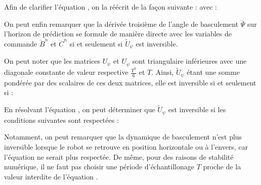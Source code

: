 					Afin de clarifier l'équation , on la réécrit de la façon suivante :
					avec :
				
					
					On peut enfin remarquer que la dérivée troisième de l'angle de basculement $\dddot\Psi$ sur l'horizon de prédiction se formule de manière directe avec les variables de commande $\dddot{B}^n$ et $\dddot{C}^n$
					si et seulement si $\tilde{U}_\psi$ est inversible.
				
					On peut noter que les matrices $U_\psi$ et $U_{\ddot{\psi}}$ sont triangulaire inférieures avec une diagonale constante de valeur respective $\frac{T^3}{6}$ et $T$.
					Ainsi, $\tilde{U}_\psi$ étant une somme pondérée par des scalaires de ces deux matrices, elle est inversible si et seulement si :
					
					En résolvant l'équation , on peut déterminer que $\tilde{U}_\psi$ est inversible si les conditions suivantes sont respectées :
					
					Notamment, on peut remarquer que la dynamique de basculement n'est plus inversible lorsque le robot se retrouve en position horizontale ou à l'envers, car l'équation  ne serait plus respectée.
					De même, pour des raisons de stabilité numérique, il ne faut pas choisir une période d'échantillonage $T$ proche de la valeur interdite de l'équation .
					
